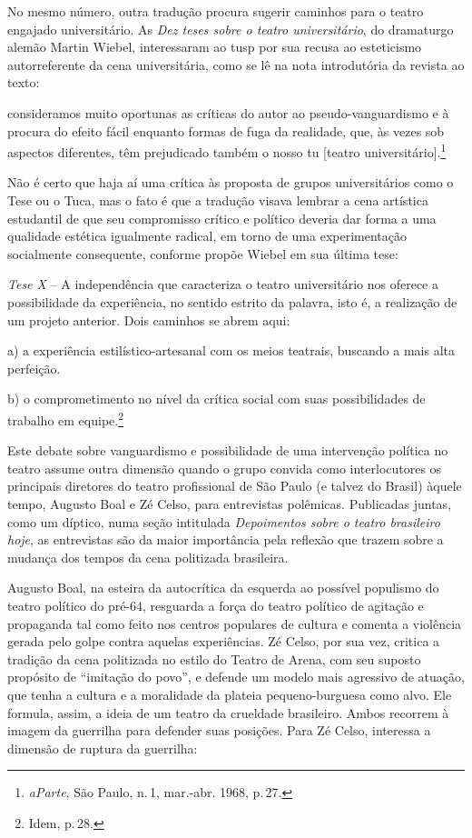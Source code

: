 No mesmo número, outra tradução procura sugerir caminhos para o teatro
engajado universitário. As {\it Dez teses sobre o teatro universitário},
do dramaturgo alemão Martin Wiebel, interessaram ao {\sc tusp} por sua recusa
ao esteticismo autorreferente da cena universitária, como se lê na nota
introdutória da revista ao texto:

\startblockquote
consideramos muito oportunas as críticas do autor ao pseudo-vanguardismo
e à procura do efeito fácil enquanto formas de fuga da realidade, que,
às vezes sob aspectos diferentes, têm prejudicado também o nosso {\sc tu}
{[}teatro universitário{]}.\footnote{{\it aParte}, São Paulo, n.\,1,
  mar.-abr. 1968, p.\,27.}
\stopblockquote

Não é certo que haja aí uma crítica às proposta de grupos universitários
como o Tese ou o Tuca, mas o fato é que a tradução visava lembrar a cena
artística estudantil de que seu compromisso crítico e político deveria
dar forma a uma qualidade estética igualmente radical, em torno de uma
experimentação socialmente consequente, conforme propõe Wiebel em sua
última tese:

\startblockquote
{\it Tese X} -- A independência que caracteriza o teatro universitário
nos oferece a possibilidade da experiência, no sentido estrito da
palavra, isto é, a realização de um projeto anterior. Dois caminhos se
abrem aqui:

a) a experiência estilístico-artesanal com os meios teatrais, buscando a
mais alta perfeição.

b) o comprometimento no nível da crítica social com suas possibilidades
de trabalho em equipe.\footnote{Idem, p.\,28.}
\stopblockquote

Este debate sobre vanguardismo e possibilidade de uma intervenção
política no teatro assume outra dimensão quando o grupo convida como
interlocutores os principais diretores do teatro profissional de São
Paulo (e talvez do Brasil) àquele tempo, Augusto Boal e Zé Celso, para
entrevistas polêmicas. Publicadas juntas, como um díptico, numa seção
intitulada {\it Depoimentos sobre o teatro brasileiro hoje}, as
entrevistas são da maior importância pela reflexão que trazem sobre a
mudança dos tempos da cena politizada brasileira.

Augusto Boal, na esteira da autocrítica da esquerda ao possível
populismo do teatro político do pré-64, resguarda a força do teatro
político de agitação e propaganda tal como feito nos centros populares
de cultura e comenta a violência gerada pelo golpe contra aquelas
experiências. Zé Celso, por sua vez, critica a tradição da cena
politizada no estilo do Teatro de Arena, com seu suposto propósito de
“imitação do povo”, e defende um modelo mais agressivo de atuação, que
tenha a cultura e a moralidade da plateia pequeno-burguesa como alvo.
Ele formula, assim, a ideia de um teatro da crueldade brasileiro. Ambos
recorrem à imagem da guerrilha para defender suas posições. Para Zé
Celso, interessa a dimensão de ruptura da guerrilha:

